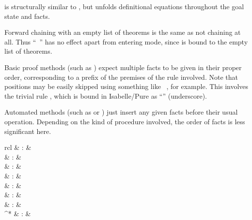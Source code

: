 \begin{isabellebody}
\begin{isamarkuptext}
\begin{descr}
  \item [\mbox{\isa{\isacommand{unfolding}}}~\isa{{\isachardoublequote}b\isactrlsub {\isadigit{1}}\ {\isasymdots}\ b\isactrlsub n{\isachardoublequote}}] is
  structurally similar to \mbox{}, but unfolds definitional
  equations  throughout the goal state
  and facts.

  \end{descr}

  Forward chaining with an empty list of theorems is the same as not
  chaining at all.  Thus ``\mbox{}~'' has no
  effect apart from entering  mode, since
  \mbox{} is bound to the empty list of theorems.

  Basic proof methods (such as \mbox{}) expect multiple
  facts to be given in their proper order, corresponding to a prefix
  of the premises of the rule involved.  Note that positions may be
  easily skipped using something like \mbox{}~, for example.  This involves the trivial rule
  , which is bound in Isabelle/Pure as
  ``\mbox{\isa{{\isacharunderscore}}}'' (underscore).

  Automated methods (such as \mbox{} or \mbox{}) just
  insert any given facts before their usual operation.  Depending on
  the kind of procedure involved, the order of facts is less
  significant here.%
\end{isamarkuptext}%
\isamarkuptrue%
%
\isamarkuptrue%
%
\begin{isamarkuptext}%
\begin{matharray}{rcl}
     & : &  \\
     & : &  \\
     & : &  \\
     & : &  \\
     & : &  \\
     & : &  \\
     & : &  \\
    ^* & : &  \\
  \end{matharray}


\end{isamarkuptext}
\end{isabellebody}
